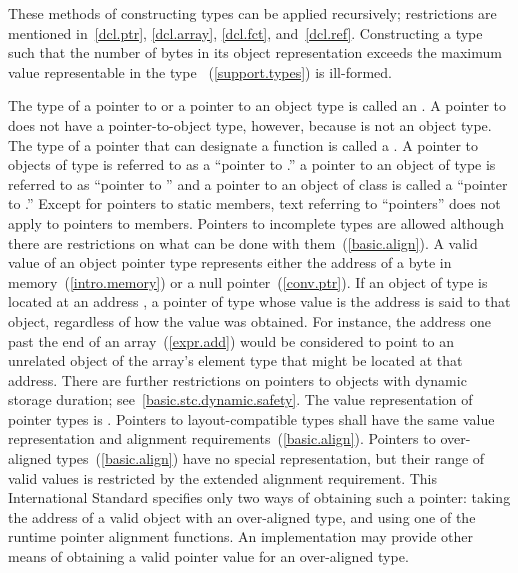 \pnum
These methods of constructing types can be applied recursively;
restrictions are mentioned in~\ref{dcl.ptr}, \ref{dcl.array},
\ref{dcl.fct}, and~\ref{dcl.ref}. Constructing a type such that the number of
bytes in its object representation exceeds the maximum value representable in
the type ~(\ref{support.types}) is ill-formed.

\pnum
{}%
The type of a pointer to  or a pointer to an object type is
called an . \enternote A pointer to 
does not have a pointer-to-object type, however, because  is not
an object type. \exitnote The type of a pointer that can designate a function
is called a .
A pointer to objects of type  is referred to as a ``pointer to
.'' \enterexample a pointer to an object of type  is
referred to as ``pointer to  '' and a pointer to an object of
class  is called a ``pointer to .'' \exitexample
Except for pointers to static members, text referring to ``pointers''
does not apply to pointers to members. Pointers to incomplete types are
allowed although there are restrictions on what can be done with
them~(\ref{basic.align}).
%
A valid value of an object
pointer type represents either the address of a byte in
memory~(\ref{intro.memory}) or a null pointer~(\ref{conv.ptr}). If an
object of type  is located at an address , a pointer
of type   whose value is the address  is
said to  that object, regardless of how the value was
obtained. \enternote For instance, the address one past the end of an
array~(\ref{expr.add}) would be considered to point to an unrelated
object of the array's element type that might be located at that
address. There are further restrictions on pointers to objects with dynamic storage
duration; see~\ref{basic.stc.dynamic.safety}. \exitnote The value representation of
pointer types is . Pointers to
layout-compatible types shall
have the same value representation and alignment
requirements~(\ref{basic.align}).
\enternote Pointers to over-aligned types~(\ref{basic.align}) have no special
representation, but their range of valid values is restricted by the extended
alignment requirement. This International Standard specifies only two ways
of obtaining such a pointer: taking the address of a valid object with
an over-aligned type, and using one of the runtime pointer alignment functions.
An implementation may provide other means of obtaining a valid pointer value
for an over-aligned type.\exitnote

